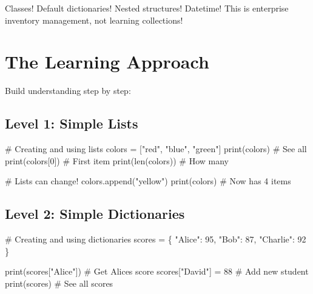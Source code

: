 \documentclass[
  letterpaper,
  DIV=11,
  numbers=noendperiod,
  oneside]{scrreprt}
\newenvironment{Shaded}{}{}
\newcommand{\BuiltInTok}[1]{\textcolor[rgb]{0.84,0.23,0.29}{#1}}
\newcommand{\CommentTok}[1]{\textcolor[rgb]{0.42,0.45,0.49}{#1}}
\newcommand{\DecValTok}[1]{\textcolor[rgb]{0.00,0.36,0.77}{#1}}
\newcommand{\NormalTok}[1]{\textcolor[rgb]{0.14,0.16,0.18}{#1}}
\newcommand{\OperatorTok}[1]{\textcolor[rgb]{0.14,0.16,0.18}{#1}}
\newcommand{\StringTok}[1]{\textcolor[rgb]{0.01,0.18,0.38}{#1}}
\begin{document}
Classes! Default dictionaries! Nested structures! Datetime! This is
enterprise inventory management, not learning collections!

\section{The Learning Approach}\label{the-learning-approach-6}

Build understanding step by step:

\subsection{Level 1: Simple Lists}\label{level-1-simple-lists}

\begin{Shaded}
\begin{Highlighting}[]
\CommentTok{\# Creating and using lists}
\NormalTok{colors }\OperatorTok{=}\NormalTok{ [}\StringTok{"red"}\NormalTok{, }\StringTok{"blue"}\NormalTok{, }\StringTok{"green"}\NormalTok{]}
\BuiltInTok{print}\NormalTok{(colors)        }\CommentTok{\# See all}
\BuiltInTok{print}\NormalTok{(colors[}\DecValTok{0}\NormalTok{])     }\CommentTok{\# First item}
\BuiltInTok{print}\NormalTok{(}\BuiltInTok{len}\NormalTok{(colors))   }\CommentTok{\# How many}

\CommentTok{\# Lists can change!}
\NormalTok{colors.append(}\StringTok{"yellow"}\NormalTok{)}
\BuiltInTok{print}\NormalTok{(colors)  }\CommentTok{\# Now has 4 items}
\end{Highlighting}
\end{Shaded}

\subsection{Level 2: Simple
Dictionaries}\label{level-2-simple-dictionaries}

\begin{Shaded}
\begin{Highlighting}[]
\CommentTok{\# Creating and using dictionaries}
\NormalTok{scores }\OperatorTok{=}\NormalTok{ \{}
    \StringTok{"Alice"}\NormalTok{: }\DecValTok{95}\NormalTok{,}
    \StringTok{"Bob"}\NormalTok{: }\DecValTok{87}\NormalTok{,}
    \StringTok{"Charlie"}\NormalTok{: }\DecValTok{92}
\NormalTok{\}}

\BuiltInTok{print}\NormalTok{(scores[}\StringTok{"Alice"}\NormalTok{])  }\CommentTok{\# Get Alice\textquotesingle{}s score}
\NormalTok{scores[}\StringTok{"David"}\NormalTok{] }\OperatorTok{=} \DecValTok{88}    \CommentTok{\# Add new student}
\BuiltInTok{print}\NormalTok{(scores)           }\CommentTok{\# See all scores}
\end{Highlighting}
\end{Shaded}
\end{document}
